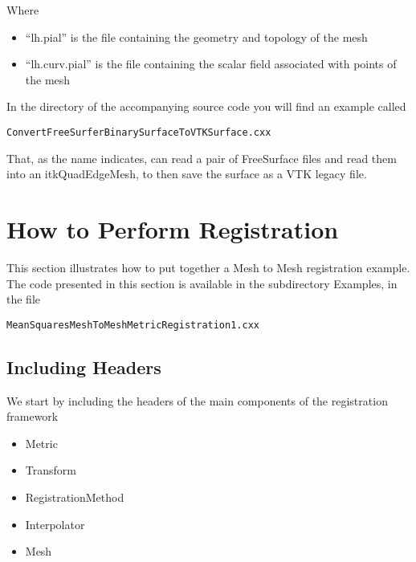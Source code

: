 \documentclass{InsightArticle}
\begin{document}
Where 

\begin{itemize}
\item ``lh.pial'' is the file containing the geometry and topology of the mesh
\item ``lh.curv.pial'' is the file containing the scalar field associated with points of the mesh
\end{itemize}

In the  directory of the accompanying source code you will find an example called

\begin{verbatim} 
ConvertFreeSurferBinarySurfaceToVTKSurface.cxx
\end{verbatim} 

That, as the name indicates, can read a pair of FreeSurface files and read them
into an itkQuadEdgeMesh, to then save the surface as a VTK legacy file.


\section{How to Perform Registration}

This section illustrates how to put together a Mesh to Mesh registration
example. The code presented in this section is available in the subdirectory
Examples, in the file

\begin{verbatim} 
MeanSquaresMeshToMeshMetricRegistration1.cxx
\end{verbatim} 

\subsection{Including Headers}

We start by including the headers of the main components of the registration framework

\begin{itemize}
\item Metric
\item Transform
\item RegistrationMethod
\item Interpolator
\item Mesh
\end{itemize}

\begin{center}

\end{center}
\end{document}

